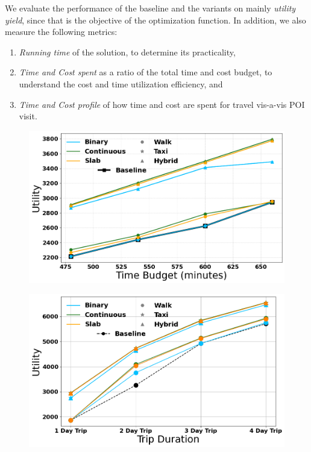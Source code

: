 We evaluate the performance of the baseline and the \trip variants on mainly \emph{utility yield}, since that is the objective of the optimization function.
In addition, we also measure the following metrics:

\begin{enumerate}
    \item \emph{Running time} of the solution, to determine its practicality,
    \item \emph{Time and Cost spent} as a ratio of the total time and cost budget, to understand the cost and time utilization efficiency, and
    \item \emph{Time and Cost profile} of how time and cost are spent for travel vis-a-vis POI visit.
\end{enumerate}

\begin{figure}[t]
\centering
\includegraphics[width=\figwidth]{plots/baseline_singleDay.png}
\label{fig:baseline-single}
\end{figure}

\begin{figure}[t]
\centering
\includegraphics[width=\figwidth]{plots/baseline_multiDay.png}
\label{fig:baseline-multi}
\end{figure}

